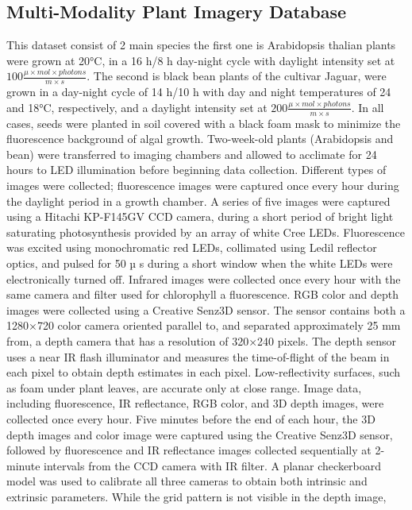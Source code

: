 \subsection{Multi-Modality Plant Imagery Database}
This dataset consist of 2 main species the first one is Arabidopsis thalian plants were grown at 20°C, in a 16 h/8 h
day-night cycle with daylight intensity set at $100 \frac{\mu \times mol \times photons}{m \times s}$. The second is black bean plants of the cultivar Jaguar, were
grown in a day-night cycle of 14 h/10 h with day and night temperatures of 24 and 18°C, respectively, and a daylight intensity set at
$200 \frac{\mu \times mol \times photons}{m \times s}$. In all cases, seeds were planted in soil covered with a black foam mask to minimize the fluorescence background
of algal growth. Two-week-old plants (Arabidopsis and bean) were transferred to imaging chambers and allowed to acclimate for 24 hours to
LED illumination before beginning data collection. Different types of images were collected; fluorescence images were captured once every
hour during the daylight period in a growth chamber. A series of five images were captured using a Hitachi KP-F145GV CCD camera, during
a short period of bright light saturating photosynthesis provided by an array of white Cree LEDs. Fluorescence was excited using
monochromatic red LEDs, collimated using Ledil reflector optics, and pulsed for 50 µ s during a short window when the white LEDs were
electronically turned off. Infrared images were collected once every hour with the same camera and filter used for chlorophyll a fluorescence.
RGB color and depth images were collected using a Creative Senz3D sensor. The sensor contains both a 1280×720 color camera oriented parallel
to, and separated approximately 25 mm from, a depth camera that has a resolution of 320×240 pixels. The depth sensor uses a near IR flash
illuminator and measures the time-of-flight of the beam in each pixel to obtain depth estimates in each pixel. Low-reflectivity surfaces,
such as foam under plant leaves, are accurate only at close range. Image data, including fluorescence, IR reflectance, RGB color, and 3D depth images, were
collected once every hour. Five minutes before the end of each hour, the 3D depth images and color image were captured using the Creative Senz3D sensor,
followed by fluorescence and IR reflectance images collected sequentially at 2-minute intervals from the CCD camera with IR filter. A planar checkerboard
model was used to calibrate all three cameras to obtain both intrinsic and extrinsic parameters. While the grid pattern is not visible in the depth image,
